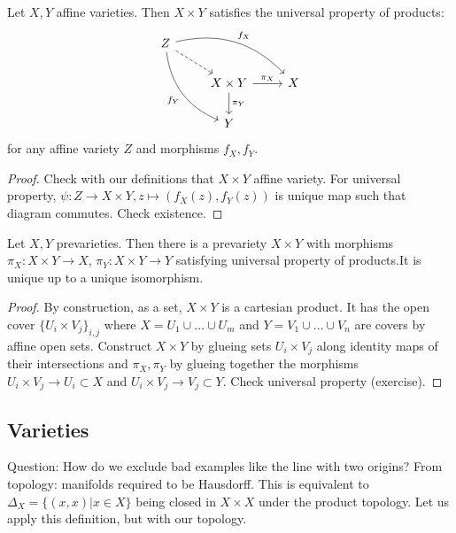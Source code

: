 \documentclass[a4paper,11pt]{article}
\begin{document}
			\begin{prop}
				Let $X,Y$ affine varieties. Then $X\times Y$ satisfies the universal property of products:
				\begin{equation*}
					\begin{tikzcd}
						Z\ar[drr,bend left,"f_X"]\ar[ddr,bend right,"f_Y"']\ar[dr,dashed] & &\\
						& X\times Y\ar[r,"\pi_X"]\ar[d,"\pi_Y"] & X\\
						& Y &
					\end{tikzcd}
				\end{equation*}
				for any affine variety $Z$ and morphisms $f_X,f_Y$.
			\end{prop}
			\begin{proof}
				Check with our definitions that $X\times Y$ affine variety. For universal property, $\psi:Z\rightarrow X\times Y,z\mapsto(f_X(z),f_Y(z))$ is unique map such that diagram commutes. Check existence. 
			\end{proof}

			\begin{prop}
				Let $X,Y$ prevarieties. Then there is a prevariety $X\times Y$ with morphisms $\pi_X:X\times Y\rightarrow X$, $\pi_Y:X\times Y\rightarrow Y$ satisfying universal property of products.It is unique up to a unique isomorphism.
			\end{prop}
			\begin{proof}
				By construction, as a set, $X\times Y$ is a cartesian product. It has the open cover $\{U_i\times V_j\}_{i,j}$ where $X=U_1\cup\dots\cup U_m$ and $Y=V_1\cup\dots\cup V_n$ are covers by affine open sets. Construct $X\times Y$ by glueing sets $U_i\times V_j$ along identity maps of their intersections and $\pi_X,\pi_Y$ by glueing together the morphisms $U_i\times V_j\rightarrow U_i\subset X$ and $U_i\times V_j\rightarrow V_j\subset Y$. Check universal property (exercise).
			\end{proof}


		\subsection{Varieties}

			\noindent Question: How do we exclude bad examples like the line with two origins? From topology: manifolds required to be Hausdorff. This is equivalent to $\Delta_X=\{(x,x)|x\in X\}$ being closed in $X\times X$ under the product topology. Let us apply this definition, but with our topology.
\end{document}
